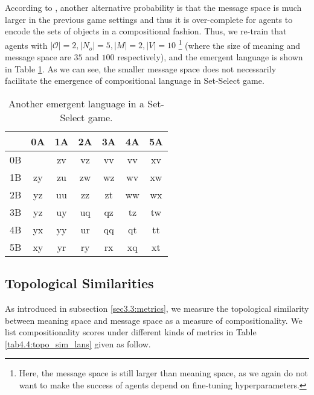 According to \cite{kottur2017natural}, another alternative probability is that the message space is much larger in the previous game settings and thus it is over-complete for agents to encode the sets of objects in a compositional fashion. Thus, we re-train that agents with $|\mathcal{O}|=2, |N_o|=5, |M|=2, |V|=10$ \footnote{Here, the message space is still larger than meaning space, as we again do not want to make the success of agents depend on fine-tuning hyperparameters.} (where the size of meaning and message space are $35$ and $100$ respectively), and the emergent language is shown in Table \ref{tab4.4:emregent_language_referential2}. As we can see, the smaller message space does not necessarily facilitate the emergence of compositional language in Set-Select game.

\begin{table}[!h]
    \centering
    \begin{tabular}{|c|c|c|c|c|c|c|}
        \hline
           & 0A & 1A & 2A & 3A & 4A & 5A \\ \hline
        0B &    & zv & vz & vv & vv & xv \\ \hline
        1B & zy & zu & zw & wz & wv & xw \\ \hline
        2B & yz & uu & zz & zt & ww & wx \\ \hline
        3B & yz & uy & uq & qz & tz & tw \\ \hline
        4B & yx & yy & ur & qq & qt & tt \\ \hline
        5B & xy & yr & ry & rx & xq & xt \\ \hline
        \end{tabular}
    \caption{Another emergent language in a Set-Select game.}
    \label{tab4.4:emregent_language_referential2}
\end{table}

\subsection{Topological Similarities}
\label{ssec4.2.2:topo_sim}

As introduced in subsection \ref{sec3.3:metrics}, we measure the topological similarity between meaning space and message space as a measure of compositionality. We list compositionality scores under different kinds of metrics in Table \ref{tab4.4:topo_sim_lans} given as follow.

